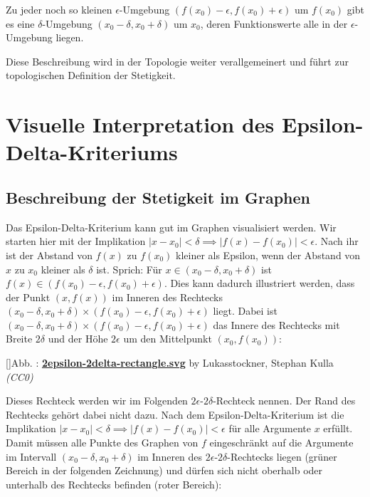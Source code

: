 \documentclass[fontsize=9pt,
               parskip=half-,
               DIV=14,
               listof=chapterentry,
               tocflat]{scrbook}
\newcounter{imagelabel}
\begin{document}
\begin{importantparagraph*}
Zu jeder noch so kleinen $\epsilon $-Umgebung $(f(x_{0})-\epsilon ,f(x_{0})+\epsilon )$ um $f(x_{0})$ gibt es eine $\delta $-Umgebung $(x_{0}-\delta ,x_{0}+\delta )$ um $x_{0}$, deren Funktionswerte alle in der $\epsilon $-Umgebung liegen.

\end{importantparagraph*}

Diese Beschreibung wird in der Topologie weiter verallgemeinert und führt zur topologischen Definition der Stetigkeit.

\section{Visuelle Interpretation des Epsilon-Delta-Kriteriums}

\subsection{Beschreibung der Stetigkeit im Graphen}

Das Epsilon-Delta-Kriterium kann gut im Graphen visualisiert werden. Wir starten hier mit der Implikation $|x-x_{0}|<\delta \implies |f(x)-f(x_{0})|<\epsilon $. Nach ihr ist der Abstand von $f(x)$ zu $f(x_{0})$ kleiner als Epsilon, wenn der Abstand von $x$ zu $x_{0}$ kleiner als $\delta $ ist. Sprich: Für $x\in (x_{0}-\delta ,x_{0}+\delta )$ ist $f(x)\in (f(x_{0})-\epsilon ,f(x_{0})+\epsilon )$. Dies kann dadurch illustriert werden, dass der Punkt $(x,f(x))$ im Inneren des Rechtecks $(x_{0}-\delta ,x_{0}+\delta )\times (f(x_{0})-\epsilon ,f(x_{0})+\epsilon )$ liegt. Dabei ist $(x_{0}-\delta ,x_{0}+\delta )\times (f(x_{0})-\epsilon ,f(x_{0})+\epsilon )$ das Innere des Rechtecks mit Breite $2\delta $ und der Höhe $2\epsilon $ um den Mittelpunkt $(x_{0},f(x_{0}))$:

[]{Abb. : \protect\href{https://commons.wikimedia.org/wiki/File:2epsilon-2delta-rectangle.svg}{\textbf{2epsilon\allowbreak-2delta\allowbreak-rectangle.svg}} by Lukasstockner, Stephan Kulla \textit{(CC0)}}\begin{center}
\end{center}

Dieses Rechteck werden wir im Folgenden $2\epsilon $-$2\delta $-Rechteck nennen. Der Rand des Rechtecks gehört dabei nicht dazu. Nach dem Epsilon-Delta-Kriterium ist die Implikation $|x-x_{0}|<\delta \implies |f(x)-f(x_{0})|<\epsilon $ für alle Argumente $x$ erfüllt. Damit müssen alle Punkte des Graphen von $f$ eingeschränkt auf die Argumente im Intervall $(x_{0}-\delta ,x_{0}+\delta )$ im Inneren des $2\epsilon $-$2\delta $-Rechtecks liegen (grüner Bereich in der folgenden Zeichnung) und dürfen sich nicht oberhalb oder unterhalb des Rechtecks befinden (roter Bereich):
\end{document}
